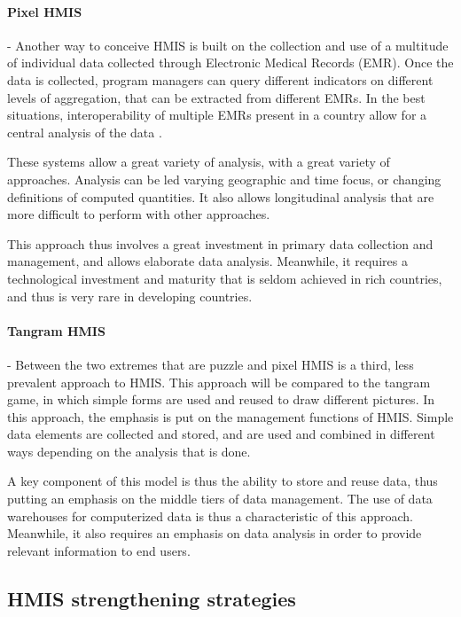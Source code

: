 \paragraph{Pixel HMIS} - Another way to conceive HMIS is built on the collection and use of a multitude of individual data collected through Electronic Medical Records (EMR). Once the data is collected, program managers can query different indicators on different levels of aggregation, that can be extracted from different EMRs. In the best situations, interoperability of multiple EMRs present in a country allow for a central analysis of the data \cite{pugliese2009large}.

These systems allow a great variety of analysis, with a great variety of approaches. Analysis can be led varying geographic and time focus, or changing definitions of computed quantities. It also allows longitudinal analysis that are more difficult to perform with other approaches.

This approach thus involves a great investment in primary data collection and management, and allows elaborate data analysis. Meanwhile, it requires a technological investment and maturity that is seldom achieved in rich countries, and thus is very rare in developing countries.

\paragraph{Tangram HMIS} - Between the two extremes that are puzzle and pixel HMIS is a third, less prevalent approach to HMIS. This approach will be compared to the tangram game, in which simple forms are used and reused to draw different pictures. In this approach, the emphasis is put on the management functions of HMIS. Simple data elements are collected and stored, and are used and combined in different ways depending on the analysis that is done.

A key component of this model is thus the ability to store and reuse data, thus putting an emphasis on the middle tiers of data management. The use of data warehouses for computerized data is thus a characteristic of this approach. Meanwhile, it also requires an emphasis on data analysis in order to provide relevant information to end users.

    \subsection{HMIS strengthening strategies}

